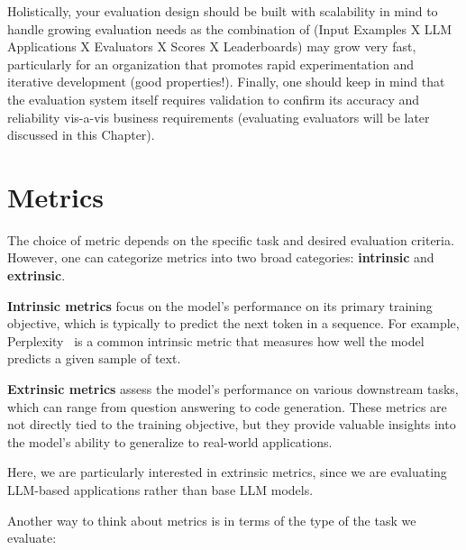 Holistically, your evaluation design should be built with scalability in mind to handle growing evaluation needs as the combination of (Input Examples X LLM Applications X Evaluators X Scores X Leaderboards) may grow very fast, particularly for an organization that promotes rapid experimentation and iterative development (good properties!). Finally, one should keep in mind that the evaluation system itself requires validation to confirm its accuracy and reliability vis-a-vis business requirements (evaluating evaluators will be later discussed in this Chapter).
\section{Metrics}

The choice of metric depends on the specific task and desired evaluation criteria. However, one can categorize metrics into two broad categories: \textbf{intrinsic} and \textbf{extrinsic}.

\textbf{Intrinsic metrics} focus on the model's performance on its primary training objective, which is typically to predict the next token in a sequence. For example, Perplexity~
is a common intrinsic metric that measures how well the model predicts a given sample of text.

\textbf{Extrinsic metrics} assess the model's performance on various downstream tasks, which can range from question answering to code generation. These metrics are not directly tied to the training objective, but they provide valuable insights into the model's ability to generalize to real-world applications.

Here, we are particularly interested in extrinsic metrics, since we are evaluating LLM-based applications rather than base LLM models.

Another way to think about metrics is in terms of the type of the task we evaluate:

